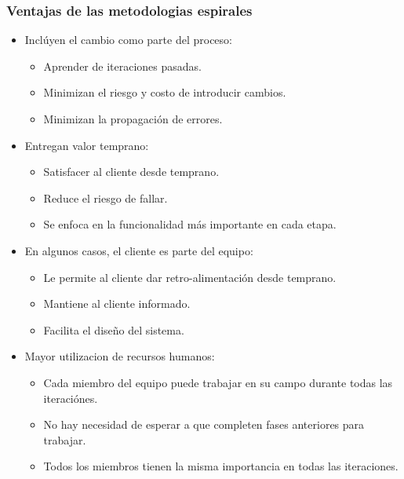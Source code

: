 \documentclass{beamer}
\begin{document}
\begin{frame}
    \frametitle{Ventajas de las metodologias espirales}
    \begin{itemize}
        \item{Incl\'uyen el cambio como parte del proceso:
            \begin{itemize}
                \item{Aprender de iteraciones pasadas.}
                \item{Minimizan el riesgo y costo de introducir cambios.}
                \item{Minimizan la propagaci\'on de errores.}
            \end{itemize}
        }
        \item{Entregan valor temprano:
            \begin{itemize}
                \item{Satisfacer al cliente desde temprano.}
                \item{Reduce el riesgo de fallar.}
                \item{Se enfoca en la funcionalidad m\'as importante en cada etapa.}
            \end{itemize}
        }
        \item{En algunos casos, el cliente es parte del equipo:
            \begin{itemize}
                \item{Le permite al cliente dar retro-alimentaci\'on desde temprano.}
                \item{Mantiene al cliente informado.}
                \item{Facilita el dise\~no del sistema.}
            \end{itemize}
        }
        \item{Mayor utilizacion de recursos humanos:
            \begin{itemize}
                \item{Cada miembro del equipo puede trabajar en su campo durante todas las iteraci\'ones.}
                \item{No hay necesidad de esperar a que completen fases anteriores para trabajar.}
                \item{Todos los miembros tienen la misma importancia en todas las iteraciones.}
            \end{itemize}
        }
    \end{itemize}
\end{frame}
\end{document}
